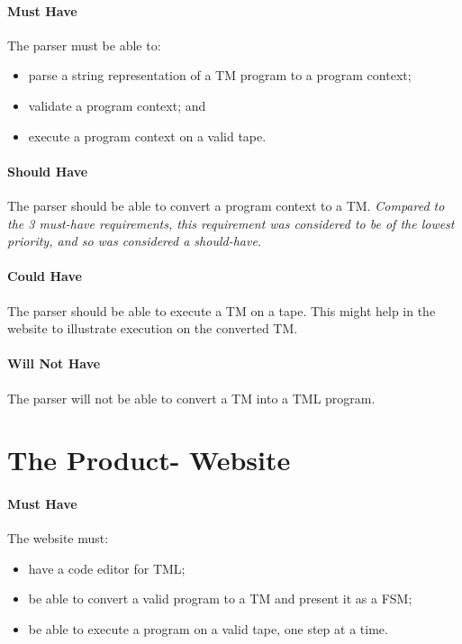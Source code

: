 \paragraph{Must Have} The parser must be able to:
\begin{itemize}
    \item parse a string representation of a TM program to a program context;
    \item validate a program context; and 
    \item execute a program context on a valid tape.
\end{itemize}

\paragraph{Should Have} The parser should be able to convert a program context to a TM. \textit{Compared to the 3 must-have requirements, this requirement was considered to be of the lowest priority, and so was considered a should-have.}

\paragraph{Could Have} The parser should be able to execute a TM on a tape. This might help in the website to illustrate execution on the converted TM.

\paragraph{Will Not Have} The parser will not be able to convert a TM into a TML program.

\section{The Product- Website}

\paragraph{Must Have} The website must:
\begin{itemize}
    \item have a code editor for TML;
    \item be able to convert a valid program to a TM and present it as a FSM;
    \item be able to execute a program on a valid tape, one step at a time.
\end{itemize}


